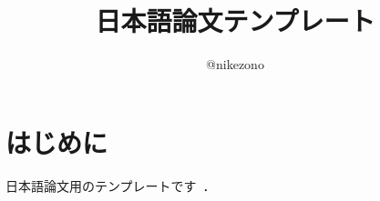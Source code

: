 \documentclass{jarticle}
\title{日本語論文テンプレート}
\author{@nikezono}
\begin{document}
\maketitle

\section{はじめに}
日本語論文用のテンプレートです~\cite{DBLP:books/mk/WeikumV2002}．



\end{document}
